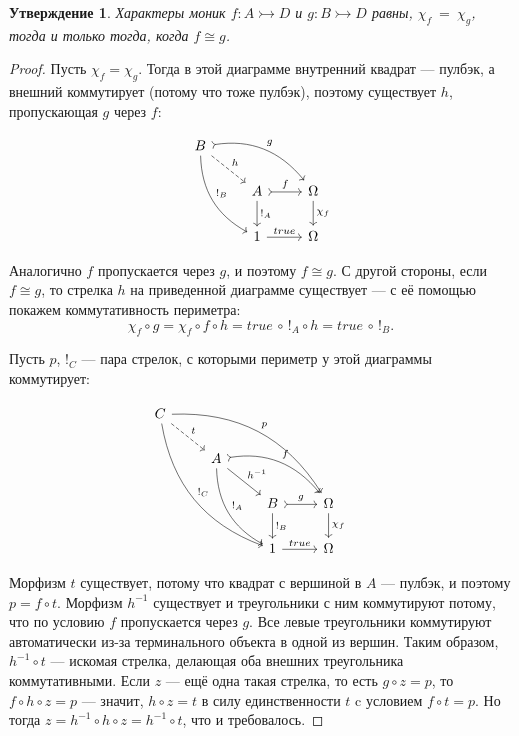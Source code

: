 \documentclass[a4paper, 12pt]{article}
\newtheorem{exercise}{Утверждение}
\begin{document}
\begin{exercise}
Характеры моник $f\colon A\rightarrowtail D$ и $g\colon B\rightarrowtail D$ равны, $\chi_f~=~\chi_g$,  тогда и только тогда, когда $f\cong g$.
\end{exercise}
\begin{proof} Пусть $\chi_f=\chi_g$. Тогда в этой диаграмме внутренний квадрат --- пулбэк, а внешний коммутирует (потому что тоже пулбэк), поэтому существует $h$, пропускающая $g$ через $f$:

\[
\begin{tikzcd}
B
\arrow[bend left, tail]{drr}{g}
\arrow[bend right]{ddr}{!_B}
\arrow[dashrightarrow]{dr}{h}
& & \\
& A \arrow{d}{!_A} \arrow[tail]{r}{f}
& \Omega \arrow{d}{\chi_f} \\
& 1 \arrow{r}{true}
& \Omega
\end{tikzcd}
\]

Аналогично $f$ пропускается через $g$, и поэтому $f\cong g$. С другой стороны, если $f\cong g$, то стрелка $h$ на приведенной диаграмме существует --- с её помощью покажем коммутативность периметра: 
$$\chi_f\circ g = \chi_f\circ f\circ h = true\,\circ\, !_A\circ h = true\,\circ\,!_B.$$ 

Пусть $p$, $!_C$ --- пара стрелок, с которыми периметр у этой диаграммы коммутирует:

\[
\begin{tikzcd}
C \arrow[bend left]{ddrrr}{p}
\arrow[bend right]{dddrr}{!_C}
\arrow[dashrightarrow]{dr}{t}
 & & & & \\
& A
\arrow[bend left, tail]{drr}{f}
\arrow[bend right]{ddr}{!_A}
\arrow{dr}{h^{-1}}
& & & \\
& & B \arrow{d}{!_B} \arrow[tail]{r}{g}
& \Omega \arrow{d}{\chi_f} \\
& & 1 \arrow{r}{true}
& \Omega
\end{tikzcd}
\]

Морфизм $t$ существует, потому что квадрат с вершиной в $A$ --- пулбэк, и поэтому $p =f \circ t$. Морфизм $h^{-1}$ существует и треугольники с ним коммутируют потому, что по условию $f$ пропускается через $g$. Все левые треугольники коммутируют автоматически из-за терминального объекта в одной из вершин. Таким образом, $h^{-1}\circ t$ --- искомая стрелка, делающая оба внешних треугольника коммутативными. Если $z$ --- ещё одна такая стрелка, то есть $g \circ z = p$, то $f\circ h\circ z = p$ --- значит, $h\circ z = t$ в силу единственности $t$ c условием $f\circ t = p$. Но тогда  $z = h^{-1}\circ h\circ z = h^{-1}\circ t$, что и требовалось.\end{proof}
\end{document}
